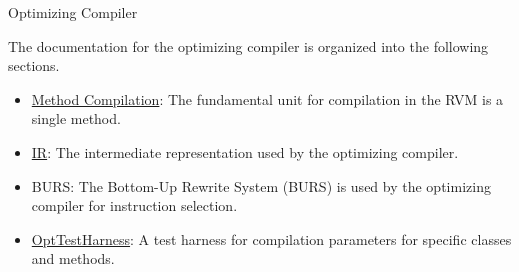 \begin{section}{Optimizing Compiler}
\label{sec:optimizingcompiler}

The documentation for the optimizing compiler is organized into the following sections.

\begin{itemize}
  \item \hyperref[sec:methodcompilation]{Method Compilation}: The fundamental unit for compilation in the RVM is a single method.
  \item \hyperref[sec:ir]{IR}: The intermediate representation used by the optimizing compiler.
  \item BURS: The Bottom-Up Rewrite System (BURS) is used by the optimizing compiler for instruction selection.
  \item \hyperref[sec:opttestharness]{OptTestHarness}: A test harness for compilation parameters for specific classes and methods.
\end{itemize}

\end{section}
